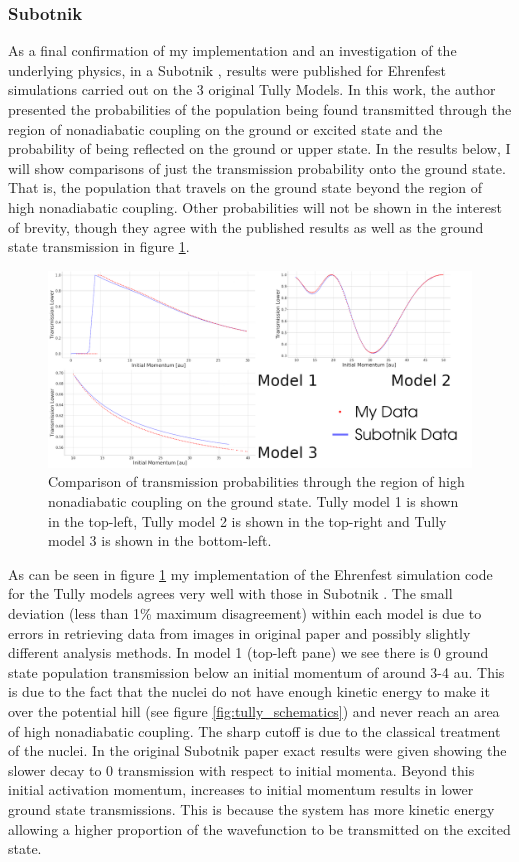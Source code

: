 \subsubsection{Subotnik}
As a final confirmation of my implementation and an investigation of the underlying physics, in a Subotnik \cite{SubotnikMomentumEhrenfest}, results were published for Ehrenfest simulations carried out on the 3 original Tully Models. In this work, the author presented the probabilities of the population being found transmitted through the region of nonadiabatic coupling on the ground or excited state and the probability of being reflected on the ground or upper state. In the results below, I will show comparisons of just the transmission probability onto the ground state. That is, the population that travels on the ground state beyond the region of high nonadiabatic coupling. Other probabilities will not be shown in the interest of brevity, though they agree with the published results as well as the ground state transmission in figure \ref{fig:SubotnikComparison}.
\begin{figure}[ht]
  \includegraphics[width=\textwidth]{../img/CTMQC/TullyModels/Ehrenfest_vs_Subotnik.png}
  \caption{\label{fig:SubotnikComparison}Comparison of transmission probabilities through the region of high nonadiabatic coupling on the ground state. Tully model 1 is shown in the top-left, Tully model 2 is shown in the top-right and Tully model 3 is shown in the bottom-left.}
\end{figure}
As can  be seen in figure \ref{fig:SubotnikComparison} my implementation of the Ehrenfest simulation code for the Tully models agrees very well with those in Subotnik \cite{SubotnikMomentumEhrenfest}. The small deviation (less than 1\% maximum disagreement) within each model is due to errors in retrieving data from images in original paper and possibly slightly different analysis methods. In model 1 (top-left pane) we see there is 0 ground state population transmission below an initial momentum of around 3-4 au. This is due to the fact that the nuclei do not have enough kinetic energy to make it over the potential hill (see figure \ref{fig:tully_schematics}) and never reach an area of high nonadiabatic coupling. The sharp cutoff is due to the classical treatment of the nuclei. In the original Subotnik \cite{SubotnikMomentumEhrenfest} paper exact results were given showing the slower decay to 0 transmission with respect to initial momenta. Beyond this initial activation momentum, increases to initial momentum results in lower ground state transmissions. This is because the system has more kinetic energy allowing a higher proportion of the wavefunction to be transmitted on the excited state.
